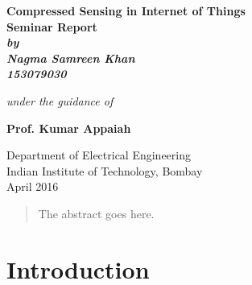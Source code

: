 \documentclass[12pt]{article}
\begin{document}
\begin{titlepage}
\thispagestyle{empty}
\vspace*{0.7cm}
{\centering     
\large
{\Large\bf Compressed Sensing in Internet of Things}\\
\vspace{3cm}
\bf{Seminar Report}\\
\vspace{0.25cm}
\vspace{0.1cm}
\it
by \\
\vspace{.5cm}
\rm
{\large \bf {Nagma Samreen Khan}}\\
{\large \bf {153079030}}

\vspace{1cm}

{\it{under the guidance of}} \\
\vspace{.5cm}

\hspace{.05cm} {\large \bf {Prof. Kumar Appaiah}}\\
\vspace {0.5cm}

\begin{figure}[h] 
{\par}
\end{figure} 

Department of Electrical Engineering \\ 
Indian Institute of Technology, Bombay\\ 
{\centering
\hspace{6.5cm}April 2016} 
}
\pagebreak 
\end{titlepage}

\begin{abstract}
The abstract goes here.
\end{abstract}
\section{Introduction}
\end{document}
